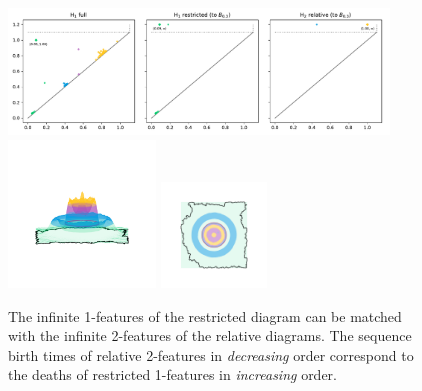\begin{figure}[htbp]
  \centering
  \includegraphics[width=0.9\textwidth]{scripts/figures/relative/dgm-0_1.pdf}
  \includegraphics[trim=500 800 500 800, clip, width=0.35\textwidth]{scripts/figures/relative/surf_side-0_1.png}
  \includegraphics[trim=500 500 500 500, clip, width=0.25\textwidth]{scripts/figures/relative/surf_top-0_1.png}
  \caption{The infinite 1-features of the restricted diagram can be matched with the infinite 2-features of the relative diagrams.
  The sequence birth times of relative 2-features in \emph{decreasing} order correspond to the deaths of restricted 1-features in \emph{increasing} order.}\label{fig:relative2}
\end{figure}
